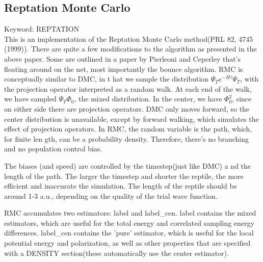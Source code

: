 \documentclass[12pt]{article}
\begin{document}

\subsection{Reptation Monte Carlo}
Keyword: REPTATION \\

This is an implementation of the Reptation Monte Carlo method(PRL 82, 4745 (1999)).  There are quite a few modifications to the algorithm as presented in the above paper. 
 Some are outlined in a paper by Pierleoni and Ceperley that's floating around on the net, most importantly the bounce algorithm.  RMC is conceptually similar to DMC, in t
hat we sample the distribution $\Psi_T e^{-H\tau} \Psi_T $, with the projection operator interpreted as a random walk.  At each end of the walk, we have sampled $\Psi_T \Phi_0$, the mixed distribution.  In the center, we have $\Phi_0^2$, since on either side there are projection operators.  DMC only moves forward, so the center 
distribution is unavailable, except by forward walking, which simulates the effect of projection operators.  In RMC, the random variable is the path, which, for finite len
gth, can be a probability density.  Therefore, there's no branching and no population control bias.  


The biases (and speed) are controlled by the timestep(just like DMC) a
nd the length of the path.  The larger the timestep and shorter the reptile, the more efficient and inaccurate the simulation. The length of the reptile should be 
around 1-3 a.u., depending on the quality of the trial wave function.

RMC accumulates two estimators: label and label\_cen.  label contains the 
mixed estimators, which are useful for the total energy and correlated
sampling energy differences.  
label\_cen contains the 'pure' estimator, which is useful for the local 
potential energy and polarization, as well as other properties that 
are specified with a DENSITY section(these automatically use the 
center estimator).
\end{document}
